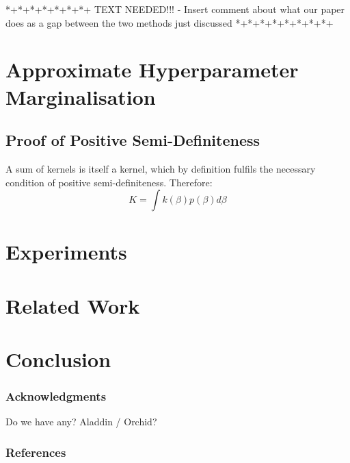 \documentclass{article}
\begin{document}
*+*+*+*+*+*+*+ TEXT NEEDED!!! - Insert comment about what our paper does as a gap between the two methods just discussed *+*+*+*+*+*+*+*+

\section{Approximate Hyperparameter Marginalisation}






\subsection{Proof of Positive Semi-Definiteness}

A sum of kernels is itself a kernel, which by definition fulfils the necessary condition of positive semi-definiteness. Therefore:
\begin{equation}
K = \int k(\beta)p(\beta)d\beta
\end{equation}


\section{Experiments}




\section{Related Work}




\section{Conclusion}



\subsubsection*{Acknowledgments}
Do we have any? Aladdin / Orchid?


\subsubsection*{References}
\renewcommand{\refname}{\vskip -0.75cm}  %

\small{

}
\end{document}
